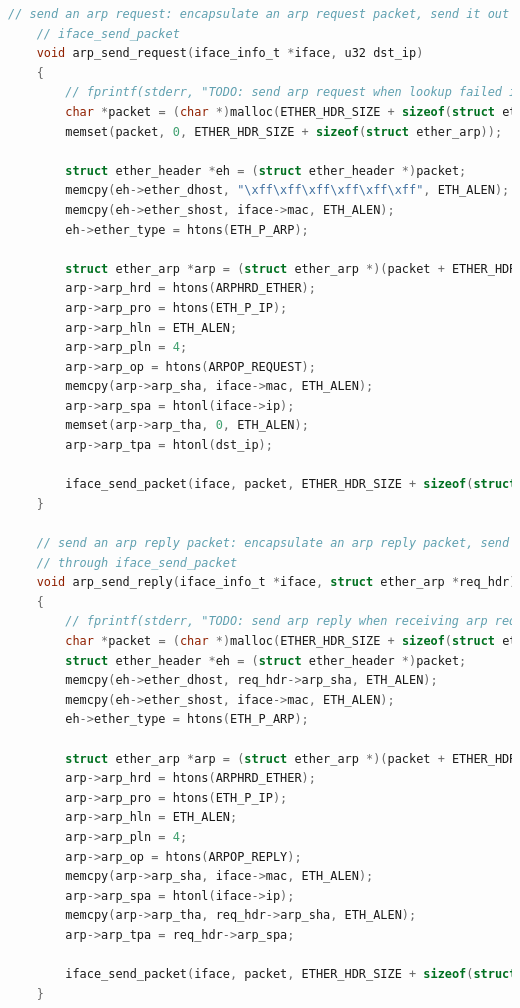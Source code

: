 \documentclass[UTF8]{report}
\begin{document}
\begin{lstlisting}[language=C]
    // send an arp request: encapsulate an arp request packet, send it out through
    // iface_send_packet
    void arp_send_request(iface_info_t *iface, u32 dst_ip)
    {
        // fprintf(stderr, "TODO: send arp request when lookup failed in arpcache.\n");
        char *packet = (char *)malloc(ETHER_HDR_SIZE + sizeof(struct ether_arp));
        memset(packet, 0, ETHER_HDR_SIZE + sizeof(struct ether_arp));
    
        struct ether_header *eh = (struct ether_header *)packet;
        memcpy(eh->ether_dhost, "\xff\xff\xff\xff\xff\xff", ETH_ALEN);
        memcpy(eh->ether_shost, iface->mac, ETH_ALEN);
        eh->ether_type = htons(ETH_P_ARP);
        
        struct ether_arp *arp = (struct ether_arp *)(packet + ETHER_HDR_SIZE);
        arp->arp_hrd = htons(ARPHRD_ETHER);
        arp->arp_pro = htons(ETH_P_IP);
        arp->arp_hln = ETH_ALEN;
        arp->arp_pln = 4;
        arp->arp_op = htons(ARPOP_REQUEST);
        memcpy(arp->arp_sha, iface->mac, ETH_ALEN);
        arp->arp_spa = htonl(iface->ip);
        memset(arp->arp_tha, 0, ETH_ALEN);
        arp->arp_tpa = htonl(dst_ip);
    
        iface_send_packet(iface, packet, ETHER_HDR_SIZE + sizeof(struct ether_arp));
    }
    
    // send an arp reply packet: encapsulate an arp reply packet, send it out
    // through iface_send_packet
    void arp_send_reply(iface_info_t *iface, struct ether_arp *req_hdr)
    {
        // fprintf(stderr, "TODO: send arp reply when receiving arp request.\n");
        char *packet = (char *)malloc(ETHER_HDR_SIZE + sizeof(struct ether_arp));
        struct ether_header *eh = (struct ether_header *)packet;
        memcpy(eh->ether_dhost, req_hdr->arp_sha, ETH_ALEN);
        memcpy(eh->ether_shost, iface->mac, ETH_ALEN);
        eh->ether_type = htons(ETH_P_ARP);
    
        struct ether_arp *arp = (struct ether_arp *)(packet + ETHER_HDR_SIZE);
        arp->arp_hrd = htons(ARPHRD_ETHER);
        arp->arp_pro = htons(ETH_P_IP);
        arp->arp_hln = ETH_ALEN;
        arp->arp_pln = 4;
        arp->arp_op = htons(ARPOP_REPLY);
        memcpy(arp->arp_sha, iface->mac, ETH_ALEN);
        arp->arp_spa = htonl(iface->ip);
        memcpy(arp->arp_tha, req_hdr->arp_sha, ETH_ALEN);
        arp->arp_tpa = req_hdr->arp_spa;
    
        iface_send_packet(iface, packet, ETHER_HDR_SIZE + sizeof(struct ether_arp));
    }
\end{lstlisting}
\end{document}
